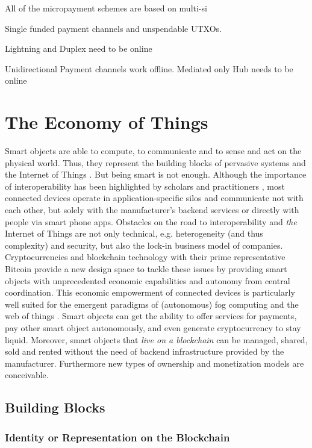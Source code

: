 All of the micropayment schemes are based on multi-si

Single funded payment channels and unspendable UTXOs.

Lightning and Duplex need to be online 

Unidirectional Payment channels work offline. Mediated only Hub needs to be online 




\chapter{The Economy of Things}
\label{sec:economy}

Smart objects are able to compute, to communicate and to sense and act on the physical world. Thus, they represent the building blocks of pervasive systems and the Internet of Things \cite{kortuem2010smart}. But being smart is not enough. Although the importance of interoperability has been highlighted by scholars \cite{zorzi2010} and practitioners \cite{manyika2015unlocking}, most connected devices operate in application-specific silos and communicate not with each other, but solely with the manufacturer's backend services or directly with people via smart phone apps.
Obstacles on the road to interoperability and \textit{the} Internet of Things are not only technical, e.g. heterogeneity (and thus complexity) and security, but also the lock-in business model of companies.
Cryptocurrencies and blockchain technology with their prime representative Bitcoin provide a new design space to tackle these issues by providing smart objects with unprecedented economic capabilities and autonomy from central coordination. This economic empowerment of connected devices is particularly well suited for the emergent paradigms of (autonomous) fog computing \cite{Bonomi:2012:FCR:2342509.2342513} and the web of things . Smart objects can get the ability to offer services for payments, pay other smart object autonomously, and even generate cryptocurrency to stay liquid. Moreover, smart objects that \textit{live on a blockchain} can be managed, shared, sold and rented without the need of backend infrastructure provided by the manufacturer. Furthermore new types of ownership and monetization models are conceivable.


\section{Building Blocks}

\subsection{Identity or Representation on the Blockchain}

